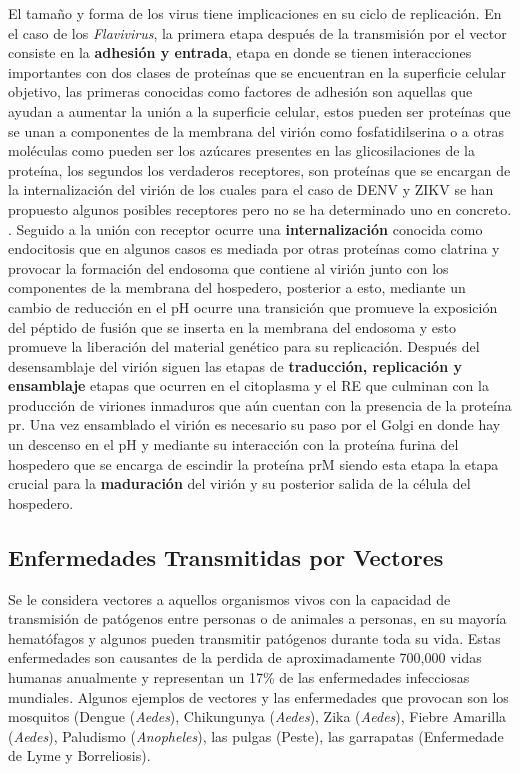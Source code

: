 El tamaño y forma de los virus tiene implicaciones en su ciclo de replicación. En el caso de los \textit{Flavivirus}, la primera etapa después de la transmisión por el vector consiste en la \textbf{adhesión y entrada}, etapa en donde se tienen interacciones importantes con dos clases de proteínas que se encuentran en la superficie celular objetivo, las primeras conocidas como factores de adhesión son aquellas que ayudan a aumentar la unión a la superficie celular, estos pueden ser proteínas que se unan a componentes de la membrana del virión como fosfatidilserina o a otras moléculas como pueden ser los azúcares presentes en las glicosilaciones de la proteína, los segundos los verdaderos receptores, son proteínas que se encargan de la internalización del virión de los cuales para el caso de \ac{DENV} y \ac{ZIKV} se han propuesto algunos posibles receptores pero no se ha determinado uno en concreto. \cite{Racaniello2020,Carro2020,Kaufmann2011,Pierson2020}. Seguido a la unión con receptor ocurre una \textbf{internalización} conocida como endocitosis que en algunos casos es mediada por otras proteínas como clatrina y provocar la formación del endosoma que contiene al virión junto con los componentes de la membrana del hospedero, posterior a esto, mediante un cambio de reducción en el pH ocurre una transición que promueve la exposición del péptido de fusión que se inserta en la membrana del endosoma y esto promueve la liberación del material genético para su replicación. \cite{Pierson2020} Después del desensamblaje del virión siguen las etapas de \textbf{traducción, replicación y ensamblaje} etapas que ocurren en el citoplasma y el \ac{RE} que culminan con la producción de viriones inmaduros que aún cuentan con la presencia de la proteína \ac{pr}.\cite{Racaniello2020,Pierson2020} Una vez ensamblado el virión es necesario su paso por el Golgi en donde hay un descenso en el pH y mediante su interacción con la proteína furina del hospedero que se encarga de escindir la proteína \ac{prM} siendo esta etapa la etapa crucial para la \textbf{maduración} del virión y su posterior salida de la célula del hospedero.\cite{Pierson2020}
\subsection{Enfermedades Transmitidas por Vectores}
Se le considera vectores a aquellos organismos vivos con la capacidad de transmisión de patógenos entre personas o de animales a personas, en su mayoría hematófagos y algunos pueden transmitir patógenos durante toda su vida. Estas enfermedades son causantes de la perdida de aproximadamente 700,000 vidas humanas anualmente y representan un 17\% de las enfermedades infecciosas mundiales. Algunos ejemplos de vectores y las enfermedades que provocan son los mosquitos (Dengue (\textit{Aedes}), Chikungunya (\textit{Aedes}), Zika (\textit{Aedes}), Fiebre Amarilla (\textit{Aedes}),  Paludismo (\textit{Anopheles}), las pulgas (Peste), las garrapatas (Enfermedade de Lyme y Borreliosis).\cite{OMSvector}


